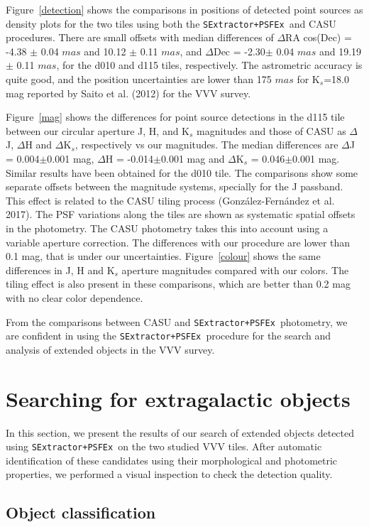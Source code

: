 \documentclass[preprint2]{aastex}
\newcommand{\dos}{{\tt SExtractor+PSFEx\ }}
\begin{document}
{ Figure~\ref{detection} shows the comparisons in positions of detected point
sources as density plots for the two tiles using both the \dos and CASU procedures.
There are small offsets with 
median differences of $\Delta$RA cos(Dec) =  -4.38 $\pm$ 0.04 $mas$ and
10.12 $\pm$
0.11 $mas$, and $\Delta$Dec = -2.30$\pm$ 0.04 $mas$ and 19.19 $\pm$ 0.11 $mas$,  for the
d010 and d115 tiles, respectively. The astrometric accuracy is quite good, and the position uncertainties
are lower than 175 $mas$ for K$_s$=18.0 mag reported by Saito et al. (2012) for the VVV survey.

Figure~\ref{mag} shows the differences for point source detections
in the d115 tile between our  circular aperture J, H, and K$_s$ 
magnitudes and those of CASU  as $\Delta$J, $\Delta$H and $\Delta$K$_s$,
respectively vs our magnitudes.
  The median differences are $\Delta$J = 0.004$\pm$0.001 mag,  
$\Delta$H = -0.014$\pm$0.001 mag and 
$\Delta$K$_s$ = 0.046$\pm$0.001 mag. Similar results have been
obtained for the d010 tile.
 The comparisons show some separate offsets between
  the magnitude systems, specially for the J passband.  This effect is related
  to the CASU tiling process (Gonz\'alez-Fern\'andez et al. 2017).  The PSF
  variations along the tiles are shown as systematic spatial offsets in the
  photometry.  The CASU photometry takes this into account using a variable
  aperture correction.  The differences with our procedure are lower than
  0.1 mag, that is under our uncertainties.   
Figure~\ref{colour} shows the same differences in J, H and  K$_s$ aperture
magnitudes compared with our colors.   The tiling effect is also present in
  these comparisons, which are better than 0.2 mag with
no clear color dependence.


 From the comparisons between CASU and \dos photometry, 
 we are confident in using
  the \dos procedure 
  for the search and analysis of extended objects in the VVV
  survey.


\section{Searching for extragalactic objects}

In this section, we present
the results of our search of extended objects detected using 
\dos on the two studied VVV tiles.  After automatic
identification of these candidates using their morphological and 
photometric properties, we performed a visual inspection 
to check the detection quality.

\subsection{Object classification}

}
\end{document}
